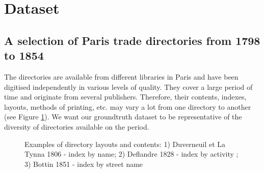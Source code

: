 \section{Dataset}
\label{sec:dataset}






\subsection{A selection of Paris trade directories from 1798 to 1854}

The directories are available from different libraries in Paris and have been digitised independently in various levels of quality. 
They cover a large period of time and originate from several publishers.
Therefore, their contents, indexes, layouts, methods of printing, etc. may vary a lot from one directory to another (see Figure \ref{fig:directories}).
We want our groundtruth dataset to be representative of the diversity of directories available on the period.

\begin{figure}[htb!]
	  \caption{\label{fig:directories} Examples of directory layouts and contents: 1) Duverneuil et La Tynna 1806 - index by name; 2) Deflandre 1828 - index by activity ; 3) Bottin 1851 - index by street name}
\end{figure}


